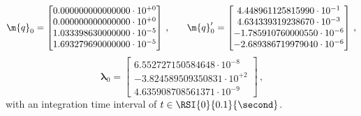 \begin{equation*}
  \m{q}_{0} = \begin{bmatrix}
    0.000000000000000\cdot10^{+0} \\
    0.000000000000000\cdot10^{+0} \\
    1.033398630000000\cdot10^{-5} \\
    1.693279690000000\cdot10^{-5}
  \end{bmatrix} \, \text{,} \qquad
  \m{q}^{\prime}_{0} = \begin{bmatrix}
     4.448961125815990\cdot10^{-1} \\
     4.634339319238670\cdot10^{-3} \\
    -1.785910760000550\cdot10^{-6} \\
    -2.689386719979040\cdot10^{-6}
  \end{bmatrix} \, \text{,}
\end{equation*}
\begin{equation*}
  \bm{\lambda}_{0} = \begin{bmatrix}
     6.552727150584648\cdot10^{-8} \\
    -3.824589509350831\cdot10^{+2} \\
     4.635908708561371\cdot10^{-9}
  \end{bmatrix} \, \text{,}
\end{equation*}
%
with an integration time interval of $t \in \RSI{0}{0.1}{\second}$.

